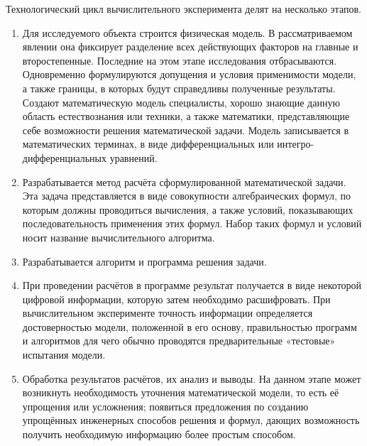 Технологический цикл вычислительного эксперимента делят на несколько этапов. \cite{lit8}
\begin{enumerate}[label*=\arabic*.]
	\item Для исследуемого объекта строится физическая модель. В рассматриваемом явлении она фиксирует разделение всех действующих факторов
	на главные и второстепенные. Последние на этом этапе исследования отбрасываются. Одновременно формулируются допущения и условия применимости модели, а также границы, в которых будут справедливы полученные результаты. Создают математическую модель специалисты, хорошо знающие данную область естествознания или техники, а также математики, представляющие себе возможности решения математической задачи.
	Модель записывается в математических терминах, в виде дифференциальных или интегро-дифференциальных уравнений.
	\item Разрабатывается метод расчёта сформулированной математической
	задачи. Эта задача представляется в виде совокупности алгебраических
	формул, по которым должны проводиться вычисления, а также условий,
	показывающих последовательность применения этих формул. Набор таких
	формул и условий носит название вычислительного алгоритма. 
	\item Разрабатывается алгоритм и программа решения задачи.
	\item При проведении расчётов в программе результат получается в
	виде некоторой цифровой информации, которую затем необходимо
	расшифровать. При вычислительном эксперименте точность информации определяется достоверностью модели, положенной в его основу,
	правильностью программ и алгоритмов для чего обычно проводятся
	предварительные «тестовые» испытания модели.
	\item Обработка результатов расчётов, их анализ и выводы. На данном
	этапе может возникнуть необходимость уточнения математической модели, то есть её упрощения или усложнения; появиться предложения по
	созданию упрощённых инженерных способов решения и формул, дающих возможность получить необходимую информацию более простым
	способом. 
\end{enumerate}

\clearpage
